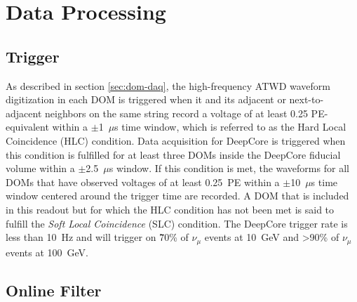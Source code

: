 

\section{Data Processing}
\label{sec:data-processing}

\subsection{Trigger}
As described in section \ref{sec:dom-daq}, the high-frequency ATWD waveform digitization in each DOM is triggered when it and its adjacent or next-to-adjacent neighbors on the same string record a voltage of at least 0.25 PE-equivalent within a $\pm$1~$\mu$s time window, which is referred to as the Hard Local Coincidence (HLC) condition. Data acquisition for DeepCore is triggered when this condition is fulfilled for at least three DOMs inside the DeepCore fiducial volume within a $\pm$2.5~$\mu$s window. If this condition is met, the waveforms for all DOMs that have observed voltages of at least 0.25~PE within a $\pm$10~$\mu$s time window centered around the trigger time are recorded. A DOM that is included in this readout but for which the HLC condition has not been met is said to fulfill the \emph{Soft Local Coincidence} (SLC) condition. The DeepCore trigger rate is less than 10~Hz and will trigger on \~70\% of $\nu_\mu$ events at 10~GeV and >90\% of $\nu_\mu$ events at 100~GeV\cite{DeepCore}.

\subsection{Online Filter}

